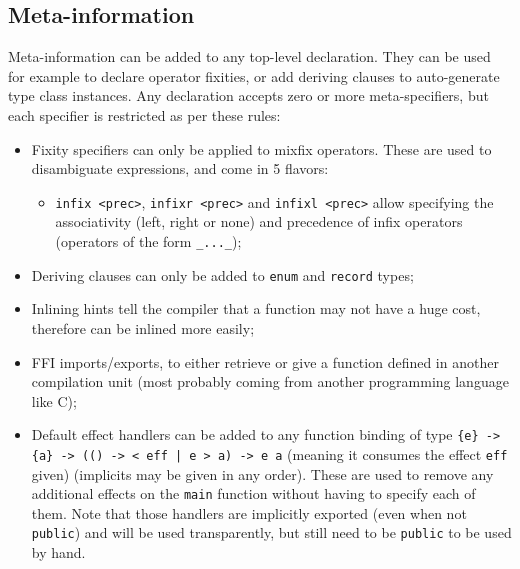 \begin{figure}[H]
	\centering

\end{figure}

\subsection{Meta-information}\label{subsec:zilch-grammar-declarations-meta}

Meta-information can be added to any top-level declaration.
They can be used for example to declare operator fixities, or add deriving clauses to auto-generate type class instances.
Any declaration accepts zero or more meta-specifiers, but each specifier is restricted as per these rules:
\begin{itemize}
	\item Fixity specifiers can only be applied to mixfix operators.
	      These are used to disambiguate expressions, and come in 5 flavors:
	      \begin{itemize}
		      \item \verb|infix <prec>|, \verb|infixr <prec>| and \verb|infixl <prec>| allow specifying the associativity (left, right or none) and precedence of infix operators (operators of the form \verb|_..._|);
	      \end{itemize}
	\item Deriving clauses can only be added to \verb|enum| and \verb|record| types;
	\item Inlining hints tell the compiler that a function may not have a huge cost, therefore can be inlined more easily;
	\item FFI imports/exports, to either retrieve or give a function defined in another compilation unit (most probably coming from another programming language like C);
	\item Default effect handlers can be added to any function binding of type \texttt{\{e\} -> \{a\} -> (() -> < eff | e > a) -> e a} (meaning it consumes the effect \verb|eff| given) (implicits may be given in any order).
	      These are used to remove any additional effects on the \verb|main| function without having to specify each of them.
	      Note that those handlers are implicitly exported (even when not \verb|public|) and will be used transparently, but still need to be \verb|public| to be used by hand.
\end{itemize}

